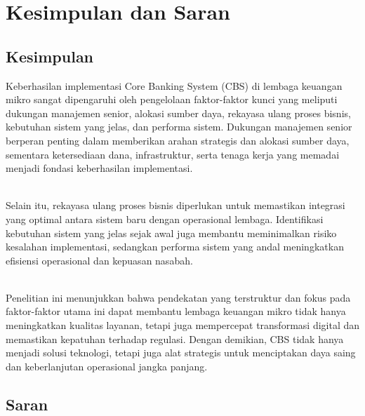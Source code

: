 \documentclass[journal,article,submit,pdftex,moreauthors]{Definitions/mdpi}
\begin{document}




\section{Kesimpulan dan Saran}
\subsection{Kesimpulan}
Keberhasilan implementasi Core Banking System (CBS) di lembaga keuangan mikro sangat dipengaruhi oleh pengelolaan faktor-faktor kunci yang meliputi dukungan manajemen senior, alokasi sumber daya, rekayasa ulang proses bisnis, kebutuhan sistem yang jelas, dan performa sistem. Dukungan manajemen senior berperan penting dalam memberikan arahan strategis dan alokasi sumber daya, sementara ketersediaan dana, infrastruktur, serta tenaga kerja yang memadai menjadi fondasi keberhasilan implementasi.

\\ Selain itu, rekayasa ulang proses bisnis diperlukan untuk memastikan integrasi yang optimal antara sistem baru dengan operasional lembaga. Identifikasi kebutuhan sistem yang jelas sejak awal juga membantu meminimalkan risiko kesalahan implementasi, sedangkan performa sistem yang andal meningkatkan efisiensi operasional dan kepuasan nasabah.

\\ Penelitian ini menunjukkan bahwa pendekatan yang terstruktur dan fokus pada faktor-faktor utama ini dapat membantu lembaga keuangan mikro tidak hanya meningkatkan kualitas layanan, tetapi juga mempercepat transformasi digital dan memastikan kepatuhan terhadap regulasi. Dengan demikian, CBS tidak hanya menjadi solusi teknologi, tetapi juga alat strategis untuk menciptakan daya saing dan keberlanjutan operasional jangka panjang.

\subsection{Saran}
\end{document}
